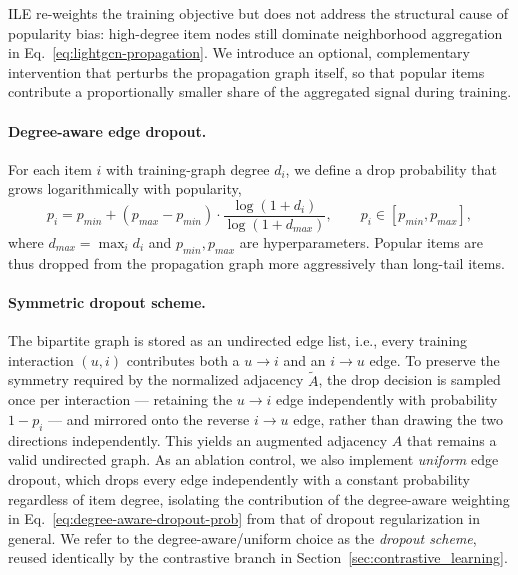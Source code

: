 ILE re-weights the training objective but does not address the structural cause of
popularity bias: high-degree item nodes still dominate neighborhood aggregation in
Eq.~\eqref{eq:lightgcn-propagation}. We introduce an optional, complementary intervention
that perturbs the propagation graph itself, so that popular items contribute a
proportionally smaller share of the aggregated signal during training.

\paragraph{Degree-aware edge dropout.}
For each item $i$ with training-graph degree $d_i$, we define a drop probability that grows
logarithmically with popularity,
\begin{equation}
    p_i = p_{min} + (p_{max} - p_{min}) \cdot \frac{\log(1+d_i)}{\log(1+d_{max})},
    \qquad p_i \in [p_{min}, p_{max}],
    \label{eq:degree-aware-dropout-prob}
\end{equation}
where $d_{max} = \max_i d_i$ and $p_{min}, p_{max}$ are hyperparameters. Popular items are
thus dropped from the propagation graph more aggressively than long-tail items.

\paragraph{Symmetric dropout scheme.}
The bipartite graph is stored as an undirected edge list, i.e., every training interaction
$(u,i)$ contributes both a $u\!\to\!i$ and an $i\!\to\!u$ edge. To preserve the symmetry
required by the normalized adjacency $\tilde{A}$, the drop decision is sampled once per
interaction --- retaining the $u\!\to\!i$ edge independently with probability $1-p_i$ --- and
mirrored onto the reverse $i\!\to\!u$ edge, rather than drawing the two directions
independently. This yields an augmented adjacency $\hat{A}$ that remains a valid undirected
graph. As an ablation control, we also implement \emph{uniform} edge dropout, which drops
every edge independently with a constant probability regardless of item degree, isolating
the contribution of the degree-aware weighting in Eq.~\eqref{eq:degree-aware-dropout-prob}
from that of dropout regularization in general. We refer to the degree-aware/uniform choice
as the \emph{dropout scheme}, reused identically by the contrastive branch in
Section~\ref{sec:contrastive_learning}.

